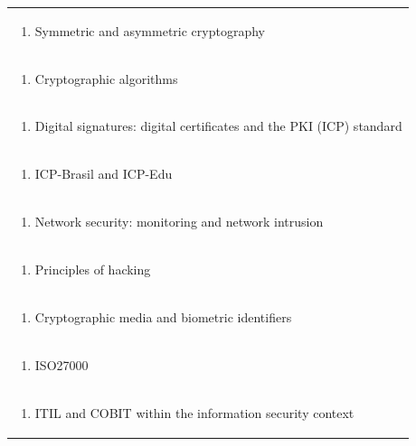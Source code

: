 \documentclass[11pt]{article}
\begin{document}
\begin{center}
\begin{longtable}{|p{4cm}|p{4cm}|p{4cm}|p{4cm}|}
\multicolumn{4}{|p{\dimexpr 16cm + 6\tabcolsep\relax}|}{\begin{enumerate}[start=2]\item Symmetric and asymmetric cryptography\end{enumerate}}\\
\multicolumn{4}{|p{\dimexpr 16cm + 6\tabcolsep\relax}|}{\begin{enumerate}[start=3]\item Cryptographic algorithms\end{enumerate}}\\
\multicolumn{4}{|p{\dimexpr 16cm + 6\tabcolsep\relax}|}{\begin{enumerate}[start=4]\item Digital signatures: digital certificates and the PKI (ICP) standard\end{enumerate}}\\
\multicolumn{4}{|p{\dimexpr 16cm + 6\tabcolsep\relax}|}{\begin{enumerate}[start=5]\item ICP-Brasil and ICP-Edu\end{enumerate}}\\
\multicolumn{4}{|p{\dimexpr 16cm + 6\tabcolsep\relax}|}{\begin{enumerate}[start=6]\item Network security: monitoring and network intrusion\end{enumerate}}\\
\multicolumn{4}{|p{\dimexpr 16cm + 6\tabcolsep\relax}|}{\begin{enumerate}[start=7]\item Principles of hacking\end{enumerate}}\\
\multicolumn{4}{|p{\dimexpr 16cm + 6\tabcolsep\relax}|}{\begin{enumerate}[start=8]\item Cryptographic media and biometric identifiers\end{enumerate}}\\
\multicolumn{4}{|p{\dimexpr 16cm + 6\tabcolsep\relax}|}{\begin{enumerate}[start=9]\item ISO27000\end{enumerate}}\\
\multicolumn{4}{|p{\dimexpr 16cm + 6\tabcolsep\relax}|}{\begin{enumerate}[start=10]\item ITIL and COBIT within the information security context\end{enumerate}}\\

\end{longtable}
\end{center}
\end{document}
